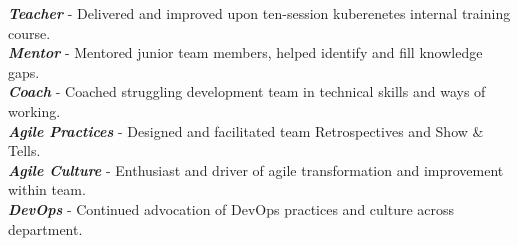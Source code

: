 \documentclass[10pt]{article} %
\begin{document}
{  
  \textit{\textbf{Teacher}} - Delivered and improved upon ten-session kuberenetes internal training course. \\
  \textit{\textbf{Mentor}} - Mentored junior team members, helped identify and fill knowledge gaps. \\
  \textit{\textbf{Coach}} - Coached struggling development team in technical skills and ways of working. \\
  \textit{\textbf{Agile Practices}} - Designed and facilitated team Retrospectives and Show \& Tells. \\
  \textit{\textbf{Agile Culture}} - Enthusiast and driver of agile transformation and improvement within team. \\
  \textit{\textbf{DevOps}} - Continued advocation of DevOps practices and culture across department. \\
}






\end{document}
